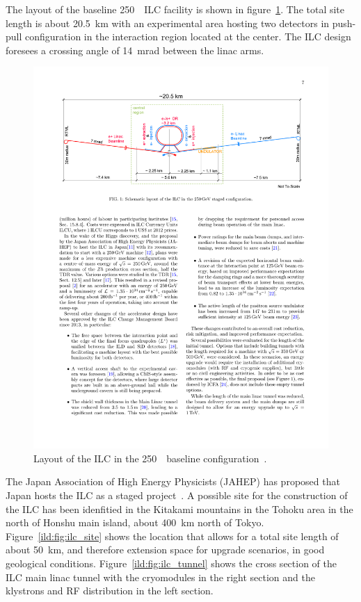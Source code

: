The layout of the baseline 250~\GeV~ILC facility is shown in figure~\ref{ild:fig:ilc_footprint}. The total site length is about 20.5~km with an experimental area hosting two detectors in push-pull configuration in the interaction region located at the center. The ILC design foresees a crossing angle of 14~mrad between the linac arms.
\begin{figure}[!ht]
\centering
\includegraphics[width=0.9\hsize]{ILC/figs/ILC_Footprint.pdf}

\caption{\label{ild:fig:ilc_footprint}Layout of the ILC in the 250~\GeV~baseline configuration~\cite{Bambade:2019fyw}.}
\end{figure}
The Japan Association of High Energy Physicists (JAHEP) has proposed that Japan hosts the ILC as a staged project~\cite{ild:bib:JAHEP}. A possible site for the construction of the ILC has been idenfitied in the Kitakami mountains in the Tohoku area in the north of Honshu main island, about 400~km north of Tokyo. Figure~\ref{ild:fig:ilc_site} shows the location that allows for a total site length of about 50~km, and therefore extension space for upgrade scenarios, in good geological conditions. Figure~\ref{ild:fig:ilc_tunnel} shows the cross section of the ILC main linac tunnel with the cryomodules in the right section and the klystrons and RF distribution in the left section.
